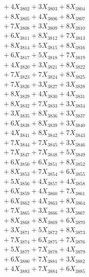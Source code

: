\documentclass[a4paper,10pt]{article}
\begin{document}
{\begin{align}
&\;  + 4 X_{3802} + 3 X_{3803} + 8 X_{3804} \\[0.3ex]
&\;  + 8 X_{3805} + 4 X_{3806} + 8 X_{3807} \\[0.3ex]
&\;  + 7 X_{3808} + 3 X_{3809} + 8 X_{3810} \\[0.3ex]
&\;  + 6 X_{3811} + 8 X_{3812} + 7 X_{3813} \\[0.3ex]
&\;  + 8 X_{3814} + 5 X_{3815} + 8 X_{3816} \\[0.3ex]
&\;  + 6 X_{3817} + 5 X_{3818} + 7 X_{3819} \\[0.5ex]\allowbreak
&\;  + 4 X_{3820} + 3 X_{3821} + 8 X_{3822} \\[0.3ex]
&\;  + 7 X_{3823} + 7 X_{3824} + 8 X_{3825} \\[0.3ex]
&\;  + 7 X_{3826} + 3 X_{3827} + 3 X_{3828} \\[0.3ex]
&\;  + 8 X_{3829} + 4 X_{3830} + 4 X_{3831} \\[0.3ex]
&\;  + 8 X_{3832} + 7 X_{3833} + 3 X_{3834} \\[0.3ex]
&\;  + 3 X_{3835} + 8 X_{3836} + 3 X_{3837} \\[0.3ex]
&\;  + 6 X_{3838} + 8 X_{3839} + 3 X_{3840} \\[0.3ex]
&\;  + 4 X_{3841} + 8 X_{3842} + 7 X_{3843} \\[0.3ex]
&\;  + 7 X_{3844} + 7 X_{3845} + 3 X_{3846} \\[0.3ex]
&\;  + 7 X_{3847} + 7 X_{3848} + 5 X_{3849} \\[0.5ex]\allowbreak
&\;  + 6 X_{3850} + 6 X_{3851} + 8 X_{3852} \\[0.3ex]
&\;  + 8 X_{3853} + 7 X_{3854} + 6 X_{3855} \\[0.3ex]
&\;  + 5 X_{3856} + 4 X_{3857} + 4 X_{3858} \\[0.3ex]
&\;  + 6 X_{3859} + 4 X_{3860} + 7 X_{3861} \\[0.3ex]
&\;  + 6 X_{3862} + 4 X_{3863} + 8 X_{3864} \\[0.3ex]
&\;  + 7 X_{3865} + 3 X_{3866} + 3 X_{3867} \\[0.3ex]
&\;  + 8 X_{3868} + 8 X_{3869} + 6 X_{3870} \\[0.3ex]
&\;  + 3 X_{3871} + 5 X_{3872} + 8 X_{3873} \\[0.3ex]
&\;  + 7 X_{3874} + 6 X_{3875} + 7 X_{3876} \\[0.3ex]
&\;  + 5 X_{3877} + 7 X_{3878} + 4 X_{3879} \\[0.5ex]\allowbreak
&\;  + 6 X_{3880} + 7 X_{3881} + 3 X_{3882} \\[0.3ex]
&\;  + 4 X_{3883} + 7 X_{3884} + 6 X_{3885} \\[0.3ex]

\end{align}}
\end{document}
